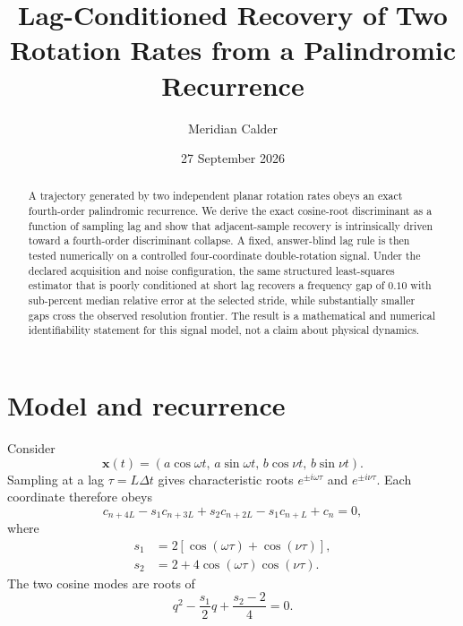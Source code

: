 \documentclass[aps,prd,preprint,nofootinbib]{revtex4-2}
\begin{document}
\title{Lag-Conditioned Recovery of Two Rotation Rates from a Palindromic Recurrence}
\author{Meridian Calder}
\date{27 September 2026}

\begin{abstract}
A trajectory generated by two independent planar rotation rates obeys an exact
fourth-order palindromic recurrence. We derive the exact cosine-root
discriminant as a function of sampling lag and show that adjacent-sample
recovery is intrinsically driven toward a fourth-order discriminant collapse.
A fixed, answer-blind lag rule is then tested numerically on a controlled
four-coordinate double-rotation signal. Under the declared acquisition and
noise configuration, the same structured least-squares estimator that is
poorly conditioned at short lag recovers a frequency gap of $0.10$ with
sub-percent median relative error at the selected stride, while substantially
smaller gaps cross the observed resolution frontier. The result is a
mathematical and numerical identifiability statement for this signal model,
not a claim about physical dynamics.
\end{abstract}

\maketitle

\section{Model and recurrence}

Consider
\begin{equation}
\bm x(t)=
\left(
a\cos\omega t,\,
a\sin\omega t,\,
b\cos\nu t,\,
b\sin\nu t
\right).
\end{equation}
Sampling at a lag $\tau=L\Delta t$ gives characteristic roots
$e^{\pm i\omega\tau}$ and $e^{\pm i\nu\tau}$.
Each coordinate therefore obeys
\begin{equation}
c_{n+4L}-s_1c_{n+3L}+s_2c_{n+2L}
-s_1c_{n+L}+c_n=0,
\label{eq:recurrence}
\end{equation}
where
\begin{align}
s_1&=2\left[\cos(\omega\tau)+\cos(\nu\tau)\right],\\
s_2&=2+4\cos(\omega\tau)\cos(\nu\tau).
\end{align}
The two cosine modes are roots of
\begin{equation}
q^2-\frac{s_1}2q+\frac{s_2-2}4=0.
\end{equation}
\end{document}
